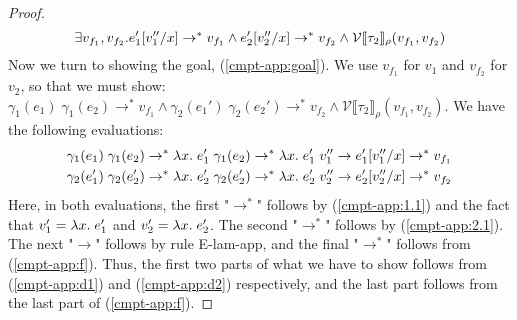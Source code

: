 \documentclass[a4paper, 11pt]{report}
\theoremstyle{definition}
\newcommand{\var}{x}
\newcommand{\expr}{e}
\newcommand{\val}{v}
\newcommand{\subst}[3]{#1{\left[#3 \middle/ #2 \right]}}
\newcommand{\typ}{\tau}
\newcommand{\step}{\rightarrow}
\newcommand{\stepS}{\rightarrow^*}
\newcommand{\ValInp}[2]{\mathcal{V} \llbracket #1 \rrbracket_{#2}}
\begin{document}
\begin{proof}
  \begin{equation}
    \exists \val_{f_1}, \val_{f_2} . \subst{\expr_1'}{\var}{\val_1''} \stepS \val_{f_1} \land \subst{\expr_2'}{\var}{\val_2''} \stepS \val_{f_2} \land \ValInp{\typ_2}{\rho}(\val_{f_1}, \val_{f_2})\label{cmpt-app:f}
  \end{equation}
  Now we turn to showing the goal, (\ref*{cmpt-app:goal}). We use $\val_{f_1}$ for $\val_1$ and $\val_{f_2}$ for $\val_2$, so that we must show:
  $\gamma_1(\expr_1) \; \gamma_1(\expr_2) \stepS \val_{f_1} \land \gamma_2(\expr_1') \; \gamma_2(\expr_2') \stepS \val_{f_2} \land \ValInp{\typ_2}{\rho}(\val_{f_1}, \val_{f_2})$. We have the following evaluations:
  \begin{align}
    &\gamma_1(\expr_1) \; \gamma_1(\expr_2) \stepS \fun \var . \expr_1' \; \gamma_1(\expr_2) \stepS \fun \var . \expr_1' \; \val_1'' \step \subst{\expr_1'}{\var}{\val_1''} \stepS \val_{f_1}\label{cmpt-app:d1}\\
    &\gamma_2(\expr_1') \; \gamma_2(\expr_2') \stepS \fun \var . \expr_2' \; \gamma_2(\expr_2') \stepS \fun \var . \expr_2' \; \val_2'' \step \subst{\expr_2'}{\var}{\val_2''} \stepS \val_{f_2}\label{cmpt-app:d2}
  \end{align}
  Here, in both evaluations, the first "$\stepS$" follows by (\ref*{cmpt-app:1.1}) and the fact that $\val_1' = \fun \var . \expr_1'$ and $\val_2' = \fun \var . \expr_2'$. The second "$\stepS$" follows by (\ref*{cmpt-app:2.1}). The next "$\step$" follows by rule E-lam-app, and the final "$\stepS$" follows from (\ref*{cmpt-app:f}). Thus, the first two parts of what we have to show follows from (\ref{cmpt-app:d1}) and (\ref*{cmpt-app:d2}) respectively, and the last part follows from the last part of (\ref*{cmpt-app:f}).
\end{proof}
\end{document}
